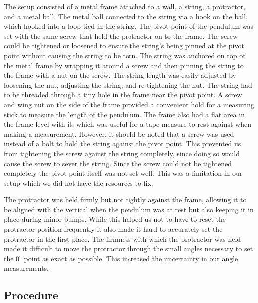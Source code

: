 \documentclass[iop]{emulateapj}
\def\deg{^{\circ}}
\begin{document}
The setup consisted of a metal frame attached to a wall, a string, a 
protractor, and a metal 
ball.  The metal ball connected to the string via a hook on the ball, which 
hooked into a loop tied in the string.  The pivot point of the pendulum was 
set with the same screw that held the protractor on to the frame.  The screw 
could be tightened or loosened to ensure the string's being pinned at the 
pivot point without causing the string to be torn.  The string was anchored 
on top of the metal frame by wrapping it around a screw and then pinning the 
string to the frame with a nut on the screw.  The string length was easily 
adjusted by loosening the nut, adjusting the string, and re-tightening the 
nut.  The string had to be threaded through a tiny hole in the frame near 
the pivot point. 
A screw and wing nut on the side of the frame provided a convenient hold 
for a measuring stick to measure the length of the pendulum.  The frame also 
had a flat area in the frame level with it, which was useful for a tape 
measure to rest against when making a measurement.  However, it should be 
noted that a screw was used instead of a bolt to hold the string against the 
pivot point.  This prevented us from tightening the screw against the string 
completely, since doing so would cause the screw to sever the string.  Since 
the screw could not be tightened completely the pivot point itself was not 
set well.  This was a limitation in our setup which we did not have the 
resources to fix.

The protractor was held firmly but not tightly against the frame, allowing it 
to be aligned with the vertical when the pendulum was at rest but also 
keeping it in place during minor bumps.  While this helped us not to have to 
reset the protractor position frequently it also made it hard to accurately 
set the protractor in the first place. The firmness with which the protractor 
was held made it difficult to move the protractor through the small angles 
necessary to set the $0\deg$ point as exact as possible.  This increased the 
uncertainty in our angle measurements.

\subsection{Procedure}
\end{document}
